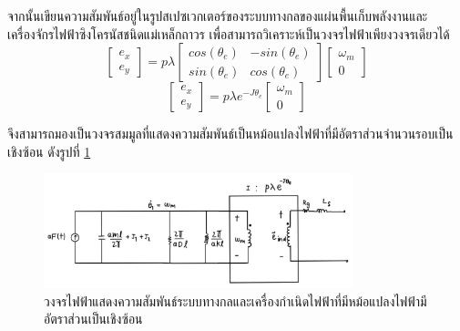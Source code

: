 \documentclass[11pt,a4paper]{article}
\begin{document}
จากนั้นเขียนความสัมพันธ์อยู่ในรูปสเปซเวกเตอร์ของระบบทางกลของแผ่นพื้นเก็บพลังงานและ เครื่องจักรไฟฟ้าซิงโครนัสชนิดแม่เหล็กถาวร เพื่อสามารถวิเคราะห์เป็นวงจรไฟฟ้าเพียงวงจรเดียวได้
\begin{equation}
    \begin{bmatrix}
        e_{x} \\ e_{y}
    \end{bmatrix} = p\lambda
    \begin{bmatrix}
        cos(\theta_{e}) & -sin(\theta_{e}) \\ sin(\theta_{e}) & cos(\theta_{e})
    \end{bmatrix}
    \begin{bmatrix}
        \omega_{m} \\ 0
    \end{bmatrix}
\end{equation}
\begin{equation}
    \begin{bmatrix}
        e_{x} \\ e_{y}
    \end{bmatrix} = p\lambda e^{-J \theta_{e} }
    \begin{bmatrix}
        \omega_{m} \\ 0
    \end{bmatrix}
\end{equation}

จึงสามารถมองเป็นวงจรสมมูลที่แสดงความสัมพันธ์เป็นหม้อแปลงไฟฟ้าที่มีอัตราส่วนจำนวนรอบเป็นเชิงซ้อน ดังรูปที่ \ref{cir_mech_elec2n2}
\begin{figure}[H]
    \begin{center}
        \includegraphics[width=0.8\textwidth]{cir_mech_elec2n2.jpg}
    \end{center}
    \caption{วงจรไฟฟ้าแสดงความสัมพันธ์ระบบทางกลและเครื่องกำเนิดไฟฟ้าที่มีหม้อแปลงไฟฟ้ามีอัตราส่วนเป็นเชิงซ้อน}
    \label{cir_mech_elec2n2}
\end{figure}
\end{document}

